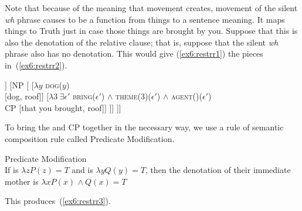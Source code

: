 Note that because of the meaning that movement creates, movement of the silent \emph{wh} phrase causes  to be a function from things to a sentence meaning. It maps things to Truth just in case those things are brought by you. Suppose that this is also the denotation of the relative clause; that is, suppose that the silent \emph{wh} phrase also has no denotation. This would give (\ref{ex6:restrr1}) the pieces in~(\ref{ex6:restrr2}).
\medskip
\begin{fullwidth}
\begin{exe}
\raggedright
	\ex \label{ex6:restrr2}
	\small
	\begin{forest}
	[DP [\ibar{D}
		[$\lambda P\ \lambda Q\ \neg \exists x\ P(x) \wedge Q(x)$  \\\obar{D} [no]]
		[NP [
			[$\lambda y$ \textsc{dog}($y$)\\ [dog, roof]]
			[$\lambda 3\ \exists \epsilon'$ \textsc{bring}($\epsilon'$) $\wedge$ \textsc{theme}($3$)($\epsilon'$) $\wedge$ \textsc{agent}()($\epsilon'$) \\CP [that you brought, roof]]
		]]
	]]
	\end{forest}
\end{exe}
\end{fullwidth}
\medskip
To bring the  and CP together in the necessary way, we use a rule of semantic composition rule called Predicate Modification.
\begin{exe}
\raggedright
	\ex \label{ex6:predmod} Predicate Modification\\
	If \denotes{$\alpha$} is $\lambda z P(z)=T$ and \denotes{$\beta$} is $\lambda y Q(y)=T$, then the denotation of their immediate mother is $\lambda x P(x)$ $\wedge\ Q(x)=T$ 
\end{exe}
This produces~(\ref{ex6:restrr3}).
\medskip
